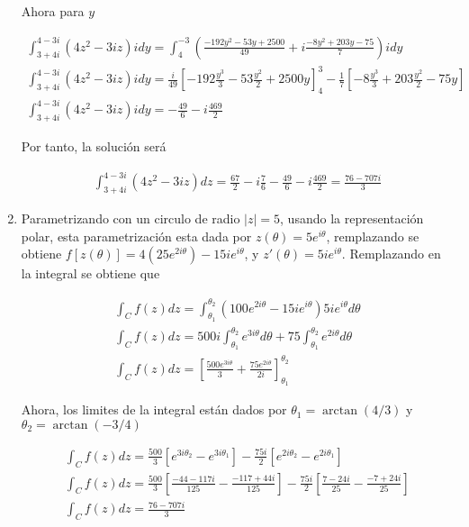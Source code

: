 \begin{enumerate}
Ahora para $y$

    \begin{gather*}
        \int_{3+4i}^{4-3i}(4z^2 - 3iz)idy = \int_{4}^{-3}\left(\frac{-192y^2 - 53y + 2500}{49} + i\frac{-8y^2 + 203y - 75}{7}\right)idy\\
        \int_{3+4i}^{4-3i}(4z^2 - 3iz)idy = \frac{i}{49}\left[-192\frac{y^3}{3} - 53\frac{y^2}{2} + 2500y\right]_4^3 - \frac{1}{7}\left[-8\frac{y^3}{3} + 203\frac{y^2}{2} - 75y\right]\\
        \int_{3+4i}^{4-3i}(4z^2 - 3iz)idy = -\frac{49}{6} -i\frac{469}{2}
    \end{gather*}

    Por tanto, la solución será

    \begin{mdframed}
        \vspace{-0.25cm}
        \begin{gather}
            \int_{3+4i}^{4-3i}(4z^2 - 3iz)dz = \frac{67}{2} - i\frac{7}{6} -\frac{49}{6} -i\frac{469}{2} = \frac{76 - 707i}{3}
        \end{gather}    
        \vspace{-0.3cm}
    \end{mdframed}

\item Parametrizando con un circulo de radio $|z| = 5$, usando la representación polar, esta parametrización esta dada por $z(\theta) = 5e^{i\theta}$, remplazando se obtiene $f[z(\theta)] = 4(25e^{2i\theta})  - 15ie^{i\theta}$, y $z'(\theta) = 5ie^{i\theta}$. Remplazando en la integral se obtiene que

\begin{gather*}
    \int_C f(z)dz = \int_{\theta_1}^{\theta_2}  (100e^{2i\theta}  - 15ie^{i\theta})5ie^{i\theta}d\theta\\
    \int_C f(z)dz = 500i \int_{\theta_1}^{\theta_2} e^{3i\theta}d\theta  + 75 \int_{\theta_1}^{\theta_2} e^{2i\theta}d\theta\\
    \int_C f(z)dz = \left[\frac{500e^{3i\theta}}{3}   + \frac{75e^{2i\theta}}{2i}\right]_{\theta_1}^{\theta_2}
\end{gather*}

Ahora, los limites de la integral están dados por $\theta_1 = \arctan(4/3)$ y $\theta_2 = \arctan(-3/4)$

\begin{gather*}
    \int_C f(z)dz = \frac{500}{3}\left[  e^{3i\theta_2} - e^{3i\theta_1} \right]  - \frac{75i}{2}\left[  e^{2i\theta_2} - e^{2i\theta_1}\right]\\
    \int_C f(z)dz = \frac{500}{3}\left[ \frac{-44 - 117i}{125} - \frac{-117 + 44i}{125} \right]  - \frac{75i}{2}\left[  \frac{7 - 24i}{25} - \frac{-7 + 24i}{25}\right]\\
    \int_C f(z)dz = \frac{76 - 707i}{3}
\end{gather*}
\end{enumerate}